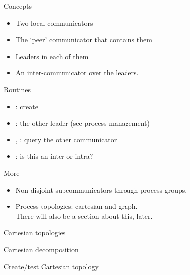 \begin{numberedframe}{Concepts}
  \label{sl:intercomm-concepts}
  \begin{itemize}
  \item Two local communicators
  \item The `peer' communicator that contains them
  \item Leaders in each of them
  \item An inter-communicator over the leaders.
  \end{itemize}
\end{numberedframe}

\begin{numberedframe}{Routines}
  \label{sl:intercomm-routines}
  \begin{itemize}
  \item
    : create
  \item {}: the other leader (see process management)
  \item {}, :
    query the other communicator
  \item {}: is this an inter or intra?
  \end{itemize}
\end{numberedframe}

\begin{numberedframe}{More}
  \begin{itemize}
  \item Non-disjoint subcommunicators through process groups.
  \item Process topologies: cartesian and graph.\\
    There will also be a section about this, later.
  \end{itemize}
\end{numberedframe}

 {Cartesian topologies}

\begin{numberedframe}{Cartesian decomposition}
\end{numberedframe}

\begin{numberedframe}{Create/test Cartesian topology}

\end{numberedframe}

